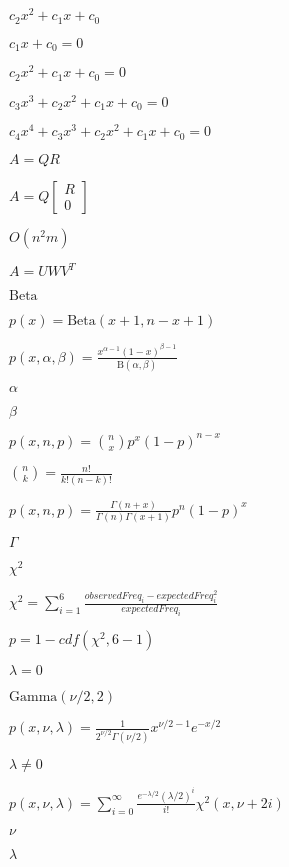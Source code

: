 \documentclass{article}
\begin{document}
$ c_2 x^2 + c_1 x + c_0 $
\pagebreak

$ c_1 x + c_0 = 0 $
\pagebreak

$ c_2 x^2 + c_1 x + c_0 = 0 $
\pagebreak

$ c_3 x^3 + c_2 x^2 + c_1 x + c_0 = 0 $
\pagebreak

$ c_4 x^4 + c_3 x^3 + c_2 x^2 + c_1 x + c_0 = 0 $
\pagebreak

$ A = Q R $
\pagebreak

$ A = Q \begin{bmatrix} R \\ 0 \end{bmatrix} $
\pagebreak

$ O(n^2 m) $
\pagebreak

$ A = U W V^T $
\pagebreak

$\mathrm{Beta}$
\pagebreak

$ p(x) = \mathrm{Beta}(x+1, n-x+1) $
\pagebreak

$\displaystyle p(x,\alpha,\beta) = \frac{x^{\alpha-1} (1-x)^{\beta-1}}{\mathrm{B}(\alpha,\beta)} $
\pagebreak

$\alpha$
\pagebreak

$\beta$
\pagebreak

$\displaystyle p(x,n,p) = \binom{n}{x} p^x (1-p)^{n-x} $
\pagebreak

$\displaystyle \binom{n}{k} = \frac{n!}{k!(n-k)!} $
\pagebreak

$\displaystyle p(x,n,p) = \frac{\Gamma(n+x)}{\Gamma(n) \Gamma(x+1)} p^n (1-p)^x $
\pagebreak

$\Gamma$
\pagebreak

$\chi^2$
\pagebreak

$\displaystyle \chi^2 = \sum_{i=1}^6 \frac{observedFreq_i - expectedFreq_i^2}{expectedFreq_i} $
\pagebreak

$ p = 1 - cdf(\chi^2, 6-1) $
\pagebreak

$\lambda = 0$
\pagebreak

$\mathrm{Gamma}(\nu/2, 2)$
\pagebreak

$\displaystyle p(x,\nu,\lambda) = \frac{1}{2^{\nu/2} \Gamma(\nu/2)} x^{\nu/2 - 1} e^{-x/2} $
\pagebreak

$\lambda \not= 0$
\pagebreak

$\displaystyle p(x,\nu,\lambda) = \sum_{i=0}^\infty \frac{e^{-\lambda/2} (\lambda/2)^i}{i!} \chi^2(x, \nu+2i) $
\pagebreak

$\nu$
\pagebreak

$\lambda$
\pagebreak
\end{document}
